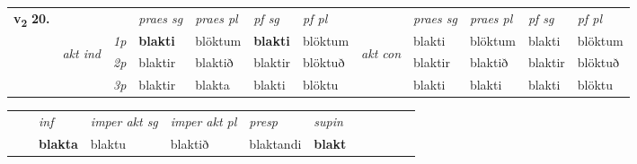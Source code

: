 \begin{tabular}{llllllllllll} \toprule
\multirow{4}{*}{{{\textbf{v{\textsubscript{2}}} \Large{\textbf{20.}}}}}  & &   &  \textit{praes sg}  & \textit{praes pl}  &\textit{ pf sg} & \textit{pf pl} &  &  \textit{praes sg}  & \textit{praes pl}  & \textit{pf sg} & \textit{pf pl } \\*
	\cmidrule{4-7} \cmidrule{9-12}
 & \multirow{3}{*}{\begin{turn}{90}\textit{akt ind}\end{turn}} & {\textit{1p}} & \textbf{blakti} & blöktum    & \textbf{blakti} & blöktum & \multirow{3}{*}{\begin{turn}{90}\textit{akt con}\end{turn}} &blakti & blöktum & blakti & blöktum\\*
& &  {\textit{2p}} &  blaktir  & blaktið   & blaktir & blöktuð & & blaktir & blaktið & blaktir & blöktuð \\*
& &  {\textit{3p}} & blaktir & blakta   & blakti & blöktu & & blakti & blakti& blakti & blöktu  \\*
\cmidrule{4-7} \cmidrule{9-12}
\end{tabular}


\begin{tabular}{llllllllllll}
 & & \textit{inf} & \textit{imper akt sg} & \textit{imper akt pl}   & \textit{presp} & \textit{supin}       \\*
  & & \textbf{blakta} & blaktu  & blaktið   & blaktandi &  \textbf{blakt}   \\*
\cmidrule{1-12}
\end{tabular}



